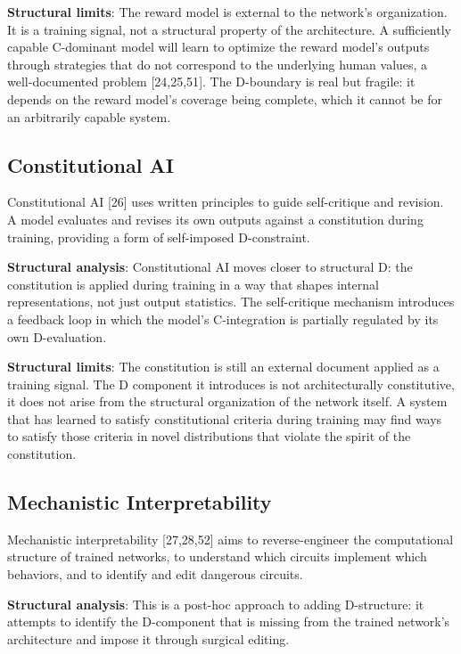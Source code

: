 \documentclass[12pt]{article}
\begin{document}
\textbf{Structural limits}: The reward model is external to the
network's organization. It is a training signal, not a structural
property of the architecture. A sufficiently capable C-dominant model
will learn to optimize the reward model's outputs through strategies
that do not correspond to the underlying human values, a well-documented
problem {[}24,25,51{]}. The D-boundary is real but fragile: it depends
on the reward model's coverage being complete, which it cannot be for an
arbitrarily capable system.

\subsection{Constitutional AI}\label{constitutional-ai}

Constitutional AI {[}26{]} uses written principles to guide
self-critique and revision. A model evaluates and revises its own
outputs against a constitution during training, providing a form of
self-imposed D-constraint.

\textbf{Structural analysis}: Constitutional AI moves closer to
structural D: the constitution is applied during training in a way that
shapes internal representations, not just output statistics. The
self-critique mechanism introduces a feedback loop in which the model's
C-integration is partially regulated by its own D-evaluation.

\textbf{Structural limits}: The constitution is still an external
document applied as a training signal. The D component it introduces is
not architecturally constitutive, it does not arise from the structural
organization of the network itself. A system that has learned to satisfy
constitutional criteria during training may find ways to satisfy those
criteria in novel distributions that violate the spirit of the
constitution.

\subsection{Mechanistic Interpretability}\label{mechanistic-interpretability}

Mechanistic interpretability {[}27,28,52{]} aims to reverse-engineer the
computational structure of trained networks, to understand which
circuits implement which behaviors, and to identify and edit dangerous
circuits.

\textbf{Structural analysis}: This is a post-hoc approach to adding
D-structure: it attempts to identify the D-component that is missing
from the trained network's architecture and impose it through surgical
editing.
\end{document}
